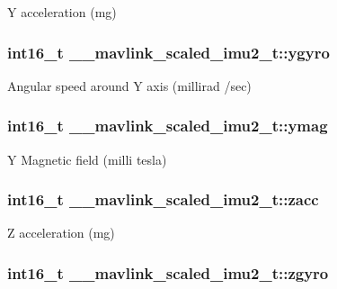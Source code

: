 Y acceleration (mg) 

\hypertarget{struct____mavlink__scaled__imu2__t_ae237b460b73135955dd2fe9b49eff4f3}{
\subsubsection[{ygyro}]{\setlength{\rightskip}{0pt plus 5cm}int16\+\_\+t \+\_\+\+\_\+mavlink\+\_\+scaled\+\_\+imu2\+\_\+t\+::ygyro}}\label{struct____mavlink__scaled__imu2__t_ae237b460b73135955dd2fe9b49eff4f3}


Angular speed around Y axis (millirad /sec) 

\hypertarget{struct____mavlink__scaled__imu2__t_aae860698ee10f61be7e4ebffa3ed7d4e}{
\subsubsection[{ymag}]{\setlength{\rightskip}{0pt plus 5cm}int16\+\_\+t \+\_\+\+\_\+mavlink\+\_\+scaled\+\_\+imu2\+\_\+t\+::ymag}}\label{struct____mavlink__scaled__imu2__t_aae860698ee10f61be7e4ebffa3ed7d4e}


Y Magnetic field (milli tesla) 

\hypertarget{struct____mavlink__scaled__imu2__t_a9562984cefad0bbce855164e3eca552d}{
\subsubsection[{zacc}]{\setlength{\rightskip}{0pt plus 5cm}int16\+\_\+t \+\_\+\+\_\+mavlink\+\_\+scaled\+\_\+imu2\+\_\+t\+::zacc}}\label{struct____mavlink__scaled__imu2__t_a9562984cefad0bbce855164e3eca552d}


Z acceleration (mg) 

\hypertarget{struct____mavlink__scaled__imu2__t_a9545e373347b74f510bfdb4ba1df372a}{
\subsubsection[{zgyro}]{\setlength{\rightskip}{0pt plus 5cm}int16\+\_\+t \+\_\+\+\_\+mavlink\+\_\+scaled\+\_\+imu2\+\_\+t\+::zgyro}}\label{struct____mavlink__scaled__imu2__t_a9545e373347b74f510bfdb4ba1df372a}


